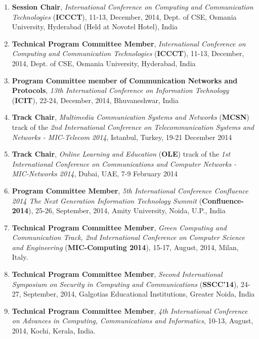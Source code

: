 \begin{enumerate} [label=(\arabic*).]
\item
\textbf{Session Chair}, \textit{International Conference on Computing and Communication Technologies} (\textbf{ICCCT}), 11-13, December, 2014, Dept. of CSE, Osmania University, Hyderabad (Held at Novotel Hotel), India

\item
\textbf{Technical Program Committee Member}, \textit{International Conference on Computing and Communication Technologies }(\textbf{ICCCT}), 11-13, December, 2014, Dept. of CSE, Osmania University, Hyderabad, India

\item
\textbf{Program Committee member of Communication Networks and Protocols}, \textit{13th International Conference on Information Technology} (\textbf{ICIT}), 22-24, December, 2014, Bhuvaneshwar, India

\item
\textbf{Track Chair}, \textit{Multimedia Communication Systems and Networks }(\textbf{MCSN}) track of the \textit{2nd International Conference on Telecommunication Systems and Networks - MIC-Telecom 2014}, Istanbul, Turkey, 19-21 December 2014 

\item
\textbf{Track Chair}, \textit{Online Learning and Education} (\textbf{OLE}) track of the \textit{1st International Conference on Communications and Computer Networks - MIC-Networks 2014}, Dubai, UAE, 7-9 February 2014

\item
\textbf{Program Committee Member}, \textit{5th International Conference Confluence 2014 The Next Generation Information Technology Summit} (\textbf{Confluence-2014}), 25-26, September, 2014, Amity University, Noida, U.P., India

\item
\textbf{Technical Program Committee Member}, \textit{Green Computing and Communication Track, 2nd International Conference on Computer Science and Engineering} (\textbf{MIC-Computing 2014}), 15-17, August, 2014, Milan, Italy.

\item
\textbf{Technical Program Committee Member},\textit{ Second International Symposium on Security in Computing and Communications} (\textbf{SSCC’14}), 24-27, September, 2014, Galgotias Educational Institutions, Greater Noida, India

\item
\textbf{Technical Program Committee Member}, \textit{4th International Conference on Advances in Computing, Communications and Informatics}, 10-13, August, 2014, Kochi, Kerala, India.


\end{enumerate}
